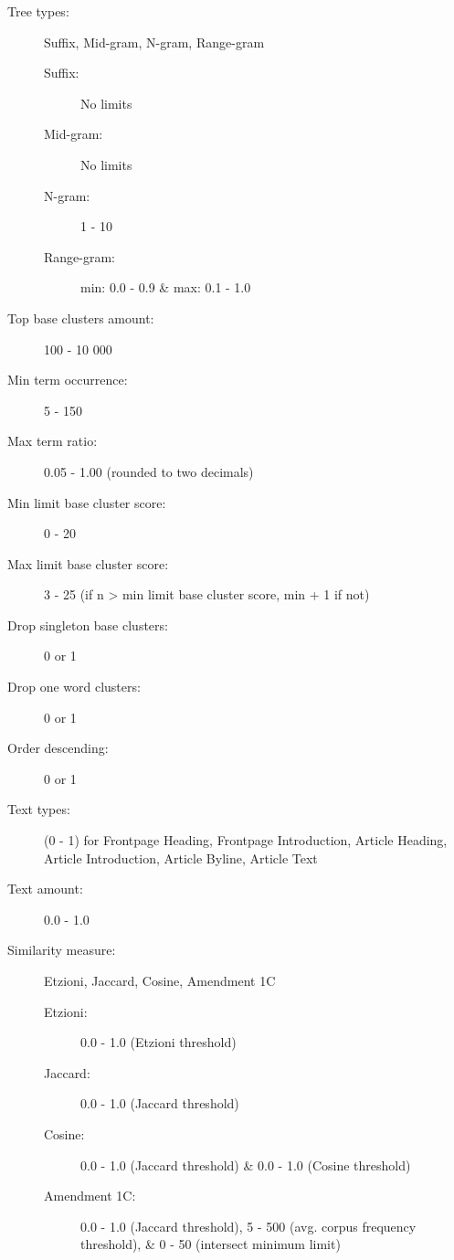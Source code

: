 \begin{description}
  \item[Tree types:] Suffix, Mid-gram, N-gram, Range-gram\hfill
  	\begin{description}
	  \item[Suffix:] No limits
	  \item[Mid-gram:] No limits
	  \item[N-gram:] 1 - 10
	  \item[Range-gram:] min: 0.0 - 0.9 \& max: 0.1 - 1.0
	\end{description}
  \item[Top base clusters amount:] 100 - 10 000
  \item[Min term occurrence:] 5 - 150
  \item[Max term ratio:] 0.05 - 1.00 (rounded to two decimals)
  \item[Min limit base cluster score:] 0 - 20
  \item[Max limit base cluster score:] 3 - 25 (if n > min limit base cluster score, min + 1 if not)
  \item[Drop singleton base clusters:] 0 or 1
  \item[Drop one word clusters:] 0 or 1
  \item[Order descending:] 0 or 1
  \item[Text types:] (0 - 1) for Frontpage Heading, Frontpage Introduction, Article Heading, Article Introduction, Article Byline, Article Text
  \item[Text amount:] 0.0 - 1.0
  \item[Similarity measure:] Etzioni, Jaccard, Cosine, Amendment 1C\hfill
  	\begin{description}
	  \item[Etzioni:] 0.0 - 1.0 (Etzioni threshold)
	  \item[Jaccard:] 0.0 - 1.0 (Jaccard threshold)
	  \item[Cosine:] 0.0 - 1.0 (Jaccard threshold) \& 0.0 - 1.0 (Cosine threshold)
	  \item[Amendment 1C:] 0.0 - 1.0 (Jaccard threshold), 5 - 500 (avg. corpus frequency threshold), \& 0 - 50 (intersect minimum limit) 
	\end{description}
\end{description}


